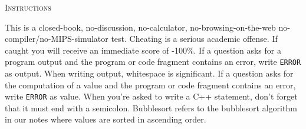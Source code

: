 \textsc{Instructions}
\begin{enumerate}
\li This is a closed-book, no-discussion, no-calculator, no-browsing-on-the-web
    no-compiler/no-MIPS-simulator test.
\li Cheating is a serious academic offense. If caught you will 
    receive an immediate score of -100\%.
\li If a question asks for a program output and the program or
    code fragment contains
    an error, write \verb!ERROR! as output.
    When writing output, whitespace is significant.
\li If a question asks for the computation of a value and the program or
    code fragment contains
    an error, write \verb!ERROR! as value.
\li When you're asked to write a C++ statement, don't forget that it must
    end with a semicolon.
\li Bubblesort refers to the bubblesort algorithm in our notes
    where values are sorted in ascending order.
\end{enumerate}

\vspace{1cm}

